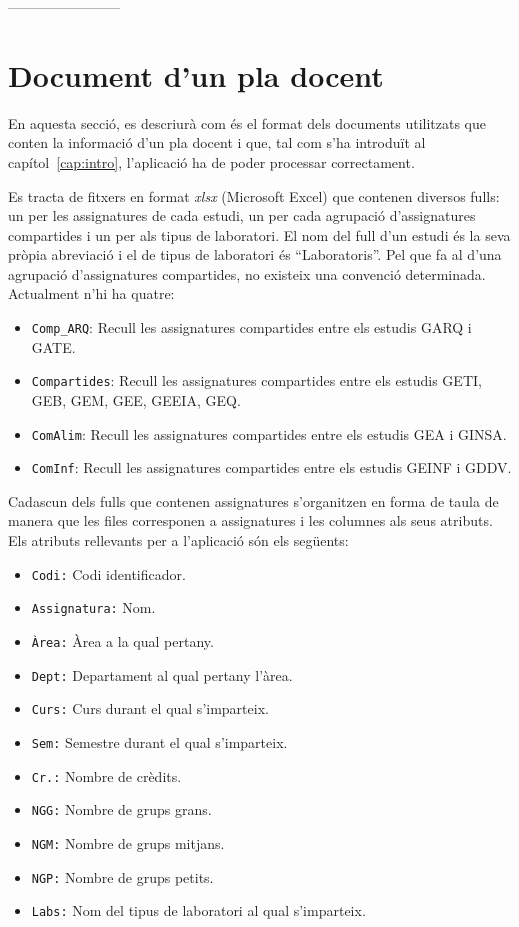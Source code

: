 \documentclass[a4paper,12pt]{ThesisStyle}
\begin{document}
------------------------

\section{Document d'un pla docent}
\label{sec:document_pla_docent}

En aquesta secció, es descriurà com és el format dels documents utilitzats que conten la informació d'un pla docent i que, tal com s'ha introduït al capítol~\ref{cap:intro}, l'aplicació ha de poder processar correctament.

Es tracta de fitxers en format \emph{xlsx} (Microsoft Excel) que contenen diversos fulls: un per les assignatures de cada estudi, un per cada agrupació d'assignatures compartides i un per als tipus de laboratori. El nom del full d'un estudi és la seva pròpia abreviació i el de tipus de laboratori és ``Laboratoris''. Pel que fa al d'una agrupació d'assignatures compartides, no existeix una convenció determinada. Actualment n'hi ha quatre:
\begin{itemize}
  \item \texttt{Comp\_ARQ}: Recull les assignatures compartides entre els estudis GARQ i GATE.
  \item \texttt{Compartides}: Recull les assignatures compartides entre els estudis GETI, GEB, GEM, GEE, GEEIA, GEQ.
  \item \texttt{ComAlim}: Recull les assignatures compartides entre els estudis GEA i GINSA.
  \item \texttt{ComInf}: Recull les assignatures compartides entre els estudis GEINF i GDDV.
\end{itemize}

Cadascun dels fulls que contenen assignatures s'organitzen en forma de taula de manera que les files corresponen a assignatures i les columnes als seus atributs. Els atributs rellevants per a l'aplicació són els següents:
\begin{itemize}
  \item \texttt{Codi:} Codi identificador.
  \item \texttt{Assignatura:} Nom.
  \item \texttt{Àrea:} Àrea a la qual pertany.
  \item \texttt{Dept:} Departament al qual pertany l'àrea.
  \item \texttt{Curs:} Curs durant el qual s'imparteix.
  \item \texttt{Sem:} Semestre durant el qual s'imparteix.
  \item \texttt{Cr.:} Nombre de crèdits.
  \item \texttt{NGG:} Nombre de grups grans.
  \item \texttt{NGM:} Nombre de grups mitjans.
  \item \texttt{NGP:} Nombre de grups petits.
  \item \texttt{Labs:} Nom del tipus de laboratori al qual s'imparteix.
\end{itemize}
\end{document}
